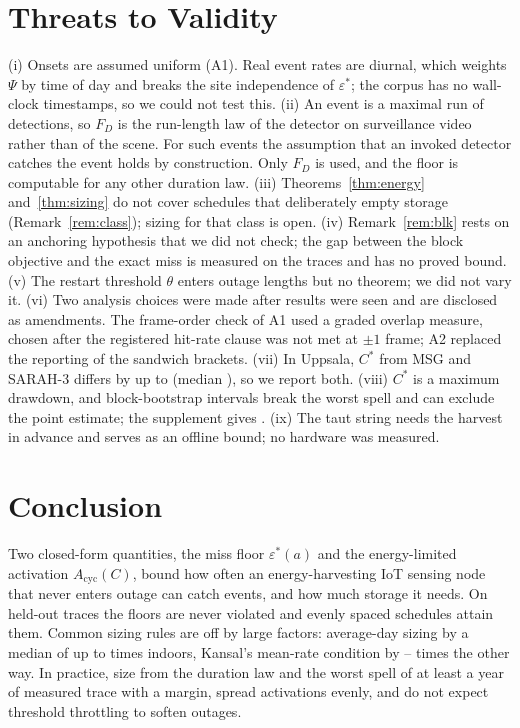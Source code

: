 \documentclass[lettersize,journal]{IEEEtran}
\theoremstyle{definition}
\theoremstyle{remark}
\newcommand{\eps}{\varepsilon}
\newcommand{\Psif}{\Psi}
\begin{document}
\section{Threats to Validity}\label{sec:threats}
(i) Onsets are assumed uniform (A1). Real event rates are diurnal, which weights $\Psif$ by time of day and breaks the site independence of $\eps^*$; the corpus has no wall-clock timestamps, so we could not test this. (ii) An event is a maximal run of detections, so $F_D$ is the run-length law of the detector on surveillance video rather than of the scene. For such events the assumption that an invoked detector catches the event holds by construction. Only $F_D$ is used, and the floor is computable for any other duration law. (iii) Theorems~\ref{thm:energy} and~\ref{thm:sizing} do not cover schedules that deliberately empty storage (Remark~\ref{rem:class}); sizing for that class is open. (iv) Remark~\ref{rem:blk} rests on an anchoring hypothesis that we did not check; the gap between the block objective and the exact miss is measured on the traces and has no proved bound. (v) The restart threshold $\theta$ enters outage lengths but no theorem; we did not vary it. (vi) Two analysis choices were made after results were seen and are disclosed as amendments. The frame-order check of A1 used a graded overlap measure, chosen after the registered hit-rate clause was not met at $\pm1$ frame; A2 replaced the reporting of the sandwich brackets. (vii) In Uppsala, $C^*$ from MSG and SARAH-3 differs by up to \uppProdDiffMax{} (median \uppProdDiffMed), so we report both. (viii) $C^*$ is a maximum drawdown, and block-bootstrap intervals break the worst spell and can exclude the point estimate; the supplement gives \blockNote. (ix) The taut string needs the harvest in advance and serves as an offline bound; no hardware was measured.

\section{Conclusion}\label{sec:conclusion}
Two closed-form quantities, the miss floor $\eps^*(a)$ and the energy-limited activation $A_{\mathrm{cyc}}(C)$, bound how often an energy-harvesting IoT sensing node that never enters outage can catch events, and how much storage it needs. On held-out traces the floors are never violated and evenly spaced schedules attain them. Common sizing rules are off by large factors: average-day sizing by a median of up to \avgIn{} times indoors, Kansal's mean-rate condition by \kmeanInvLo--\kmeanInvHi{} times the other way. In practice, size from the duration law and the worst spell of at least a year of measured trace with a margin, spread activations evenly, and do not expect threshold throttling to soften outages.
\end{document}

